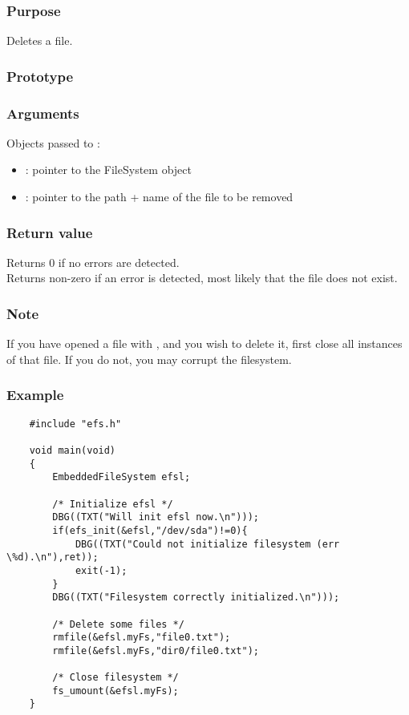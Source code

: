 \subsubsection*{Purpose}
Deletes a file.
\subsubsection*{Prototype}
\subsubsection*{Arguments}
Objects passed to :
\begin{itemize}
	\item{: pointer to the FileSystem object}
	\item{: pointer to the path + name of the file to be removed}
\end{itemize}
\subsubsection*{Return value}
Returns 0 if no errors are detected.\\
\newline
Returns non-zero if an error is detected, most likely that the file does not exist.
\subsubsection*{Note}
If you have opened a file with , and you wish to delete it, first
close all instances of that file. If you do not, you may corrupt the filesystem.
\subsubsection*{Example}
\lstset{numbers=left, stepnumber=1, numberstyle=\small, numbersep=5pt, tabsize=4}
\begin{lstlisting}
	#include "efs.h"

	void main(void)
	{
		EmbeddedFileSystem efsl;

		/* Initialize efsl */
		DBG((TXT("Will init efsl now.\n")));
		if(efs_init(&efsl,"/dev/sda")!=0){
			DBG((TXT("Could not initialize filesystem (err \%d).\n"),ret));
			exit(-1);
		}
		DBG((TXT("Filesystem correctly initialized.\n")));

		/* Delete some files */
		rmfile(&efsl.myFs,"file0.txt");
		rmfile(&efsl.myFs,"dir0/file0.txt");
		
		/* Close filesystem */
		fs_umount(&efsl.myFs);
	}
\end{lstlisting}
